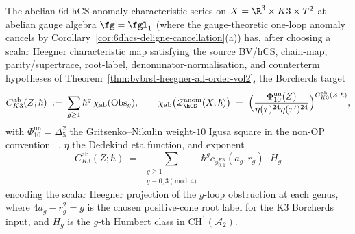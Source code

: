 \begin{theorem}
\label{thm:6dhcs-borcherds-exp}
The abelian 6d hCS anomaly characteristic series on
$X=\R^3\times K3\times T^2$ at abelian gauge algebra $\fg=\fgl_1$
(where the gauge-theoretic one-loop anomaly cancels by
Corollary~\ref{cor:6dhcs-deligne-cancellation}\textup{(a)}) has, after choosing
a scalar Heegner characteristic map satisfying the source BV/hCS,
chain-map, parity/supertrace, root-label, denominator-normalisation,
and counterterm hypotheses of
Theorem~\ref{thm:bvbrst-heegner-all-order-vol2}, the Borcherds target
\begin{equation}\label{eq:6dhcs-borcherds-product}
 C_{K3}^{\mathrm{ab}}(Z;\hbar)
 \;:=\;
 \sum_{g\geq 1}\hbar^g\,\chi_{\mathrm{ab}}(\mathrm{Obs}_g),
 \qquad
 \chi_{\mathrm{ab}}\bigl(\mathcal Z_{\hCS}^{\mathrm{anom}}(X,\hbar)\bigr)
 \;=\;
 \Bigl(\frac{\Phi_{10}^{\mathrm{un}}(Z)}
 {\eta(\tau)^{24}\eta(\tau')^{24}}\Bigr)^{C_{K3}^{\mathrm{ab}}(Z;\hbar)},
\end{equation}
with $\Phi_{10}^{\mathrm{un}}=\Delta_5^2$ the Gritsenko--Nikulin
weight-$10$ Igusa square in the non-OP convention
~\cite{GritsenkoNikulin1998,DijkgraafVerlindeVerlinde1997},
\(\eta\) the Dedekind eta function, and exponent
\begin{equation}\label{eq:6dhcs-cK3}
 C_{K3}^{\mathrm{ab}}(Z;\hbar)
 \;=\; \sum_{\substack{g\geq1\\ g\equiv0,3\pmod 4}}
 \hbar^g c_{\phi_{0,1}^{K3}}(a_g,r_g)\cdot H_g
\end{equation}
encoding the scalar Heegner projection of the $g$-loop obstruction at
each genus, where
\(4a_g-r_g^2=g\) is the chosen positive-cone root label for the
K3 Borcherds input, and
\(H_g\) is the \(g\)-th Humbert class in
$\mathrm{CH}^1(\mathcal{A}_2)$.
\end{theorem}

